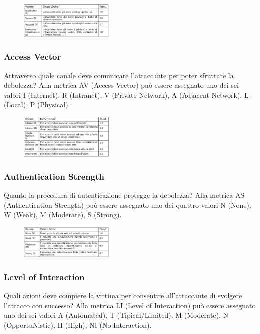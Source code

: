 \begin{figure}[hbpt!]
    \centering
    \includegraphics[width=0.4\textwidth]{./Images/cap3/3.10.png}
\end{figure}
\FloatBarrier

\subsubsection{Access Vector}
Attraverso quale canale deve comunicare l’attaccante
per poter sfruttare la debolezza? Alla metrica AV (Access Vector) può essere
assegnato uno dei sei valori
I (Internet), R (Intranet), V (Private Network),
A (Adjacent Network), L (Local), P (Physical).

\begin{figure}[hbpt!]
    \centering
    \includegraphics[width=0.4\textwidth]{./Images/cap3/3.11.png}
\end{figure}
\FloatBarrier

\subsubsection{Authentication Strength}
Quanto la procedura di autenticazione
protegge la debolezza? Alla metrica AS (Authentication Strength) può essere
assegnato uno dei quattro valori
N (None), W (Weak), M (Moderate), S (Strong).

\begin{figure}[hbpt!]
    \centering
    \includegraphics[width=0.4\textwidth]{./Images/cap3/3.12.png}
\end{figure}
\FloatBarrier

\subsubsection{Level of Interaction}
Quali azioni deve compiere la vittima per consentire
all’attaccante di svolgere l’attacco con successo? Alla metrica LI (Level of Interaction) può essere
assegnato uno dei sei valori
A (Automated), T (Tipical/Limited), M (Moderate),
N (OpportuNistic), H (High), NI (No Interaction).

